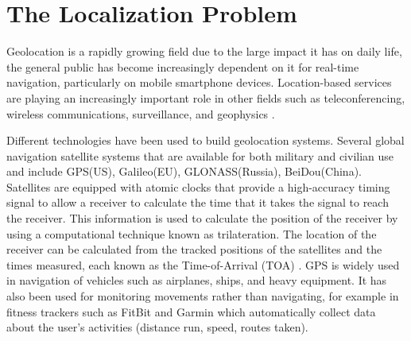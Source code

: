 \label{chapter:introduction}



\section{The Localization Problem} \label{problem}

Geolocation is a rapidly growing field due to the large impact it has on daily life, the general public has become increasingly dependent on it for real-time navigation, particularly on mobile smartphone devices. Location-based services are  playing an increasingly important role in other fields such as teleconferencing, wireless communications, surveillance, and geophysics \cite{Cheung, classMDS, CheungChan, Huang, LiHu,  Sayed,
ShcauRob, SmithAbel,  Yao}.

Different technologies have been used to build geolocation systems. Several global navigation satellite systems that are available for both military and civilian use and include GPS(US), Galileo(EU), GLONASS(Russia), BeiDou(China). Satellites are equipped with atomic clocks that provide a high-accuracy timing signal to  allow a receiver to calculate the time that it takes the signal to reach the receiver. This information is used to calculate the position of the receiver by using a  computational technique known as trilateration. The location of the receiver can be calculated from the
tracked positions of the satellites and the times measured, each known as the Time-of-Arrival (TOA) \cite{GeoLoc}.
%
 GPS is widely used in navigation of vehicles such as airplanes, ships, and heavy equipment. It has also been used for monitoring movements rather than navigating, for example in fitness trackers such as FitBit \cite{FB} and Garmin\cite{Garmin} which automatically collect data about the user's activities (distance run, speed, routes taken).
 

